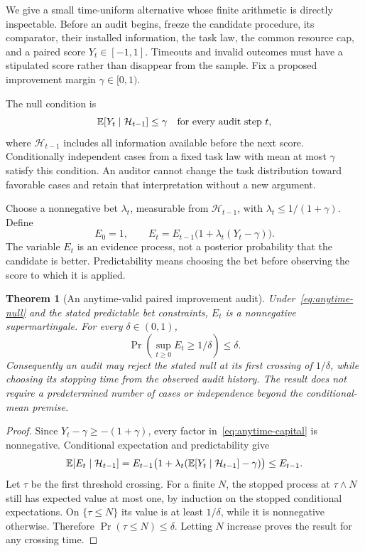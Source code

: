 \documentclass[11pt,letterpaper]{article}
\theoremstyle{plain}
\newtheorem{theorem}{Theorem}[section]
\theoremstyle{definition}
\begin{document}
We give a small time-uniform alternative whose finite arithmetic is directly inspectable. Before an audit begins, freeze the candidate procedure, its comparator, their installed information, the task law, the common resource cap, and a paired score $Y_t\in[-1,1]$. Timeouts and invalid outcomes must have a stipulated score rather than disappear from the sample. Fix a proposed improvement margin $\gamma\in[0,1)$.

The null condition is
\begin{equation}\label{eq:anytime-null}
\mathbb E[Y_t\mid\mathcal H_{t-1}]\leq\gamma
\quad\text{for every audit step }t,
\end{equation}
where $\mathcal H_{t-1}$ includes all information available before the next score. Conditionally independent cases from a fixed task law with mean at most $\gamma$ satisfy this condition. An auditor cannot change the task distribution toward favorable cases and retain that interpretation without a new argument.

Choose a nonnegative bet $\lambda_t$, measurable from $\mathcal H_{t-1}$, with $\lambda_t\leq1/(1+\gamma)$. Define
\begin{equation}\label{eq:anytime-capital}
E_0=1,\qquad E_t=E_{t-1}\bigl(1+\lambda_t(Y_t-\gamma)\bigr).
\end{equation}
The variable $E_t$ is an evidence process, not a posterior probability that the candidate is better. Predictability means choosing the bet before observing the score to which it is applied.

\begin{theorem}[An anytime-valid paired improvement audit]\label{thm:anytime}
Under~\eqref{eq:anytime-null} and the stated predictable bet constraints, $E_t$ is a nonnegative supermartingale. For every $\delta\in(0,1)$,
\[
\Pr\left(\sup_{t\geq0}E_t\geq1/\delta\right)\leq\delta.
\]
Consequently an audit may reject the stated null at its first crossing of $1/\delta$, while choosing its stopping time from the observed audit history. The result does not require a predetermined number of cases or independence beyond the conditional-mean premise.
\end{theorem}
\begin{proof}
Since $Y_t-\gamma\geq-(1+\gamma)$, every factor in~\eqref{eq:anytime-capital} is nonnegative. Conditional expectation and predictability give
\[
\mathbb E[E_t\mid\mathcal H_{t-1}]
=E_{t-1}\bigl(1+\lambda_t(\mathbb E[Y_t\mid\mathcal H_{t-1}]-\gamma)\bigr)
\leq E_{t-1}.
\]
Let $\tau$ be the first threshold crossing. For a finite $N$, the stopped process at $\tau\wedge N$ still has expected value at most one, by induction on the stopped conditional expectations. On $\{\tau\leq N\}$ its value is at least $1/\delta$, while it is nonnegative otherwise. Therefore $\Pr(\tau\leq N)\leq\delta$. Letting $N$ increase proves the result for any crossing time.
\end{proof}
\end{document}
